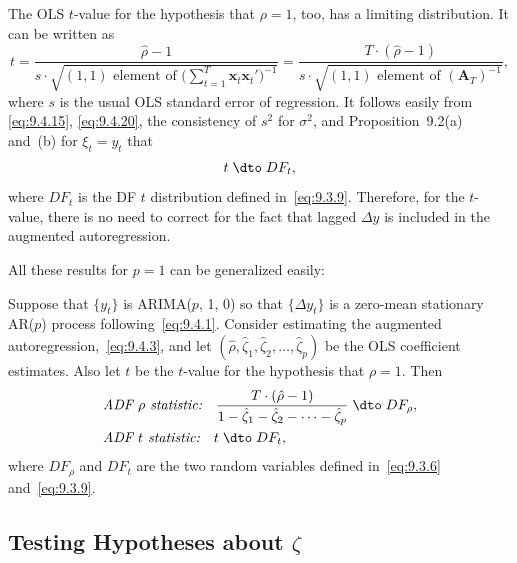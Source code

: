 The OLS $t$-value for the hypothesis that $\rho = 1$, too, has a limiting distribution.
It can be written as
\begin{equation}
\label{eq:9.4.23}
t = \frac{\hat{\rho} - 1}{s \cdot \sqrt{(1, 1) \text{ element of } \big(\sum_{t=1}^{T} \mathbf{x}_t \mathbf{x}_t'\big)^{-1}}}
= \frac{T \cdot (\hat{\rho} - 1)}{s \cdot \sqrt{(1,1) \text{ element of } (\mathbf{A}_T)^{-1}}},
\end{equation}
where $s$ is the usual OLS standard error of regression. It follows easily from
\eqref{eq:9.4.15}, \eqref{eq:9.4.20}, the consistency of $s^2$ for $\sigma^2$, and Proposition~9.2(a) and~(b) for
$\xi_t = y_t$ that
\begin{equation}
\label{eq:9.4.24}
t \;\dto\; DF_t,
\end{equation}
where $DF_t$ is the DF $t$ distribution defined in~\eqref{eq:9.3.9}. Therefore, for the $t$-value,
there is no need to correct for the fact that lagged $\Delta y$ is included in the augmented
autoregression.

All these results for $p = 1$ can be generalized easily:

\begin{proposition}
\label{prop:9.6}
Suppose that $\{y_t\}$ is ARIMA($p$, 1, 0) so that $\{\Delta y_t\}$ is a zero-mean stationary AR($p$) process following~\eqref{eq:9.4.1}. Consider estimating the augmented autoregression,~\eqref{eq:9.4.3}, and let $(\hat{\rho}, \hat{\zeta}_1, \hat{\zeta}_2, \ldots, \hat{\zeta}_p)$ be the OLS coefficient estimates. Also
let $t$ be the $t$-value for the hypothesis that $\rho = 1$. Then
\begin{align}
&\textit{ADF $\rho$ statistic:}\quad
\frac{T \cdot (\hat{\rho} - 1)}{1 - \hat{\zeta}_1 - \hat{\zeta}_2 - \cdots - \hat{\zeta}_p}
\;\dto\; DF_\rho,
\label{eq:9.4.25} \\
&\textit{ADF $t$ statistic:}\quad t \;\dto\; DF_t,
\label{eq:9.4.26}
\end{align}
where $DF_\rho$ and $DF_t$ are the two random variables defined in~\eqref{eq:9.3.6} and~\eqref{eq:9.3.9}.
\end{proposition}

\subsection*{Testing Hypotheses about $\zeta$}


